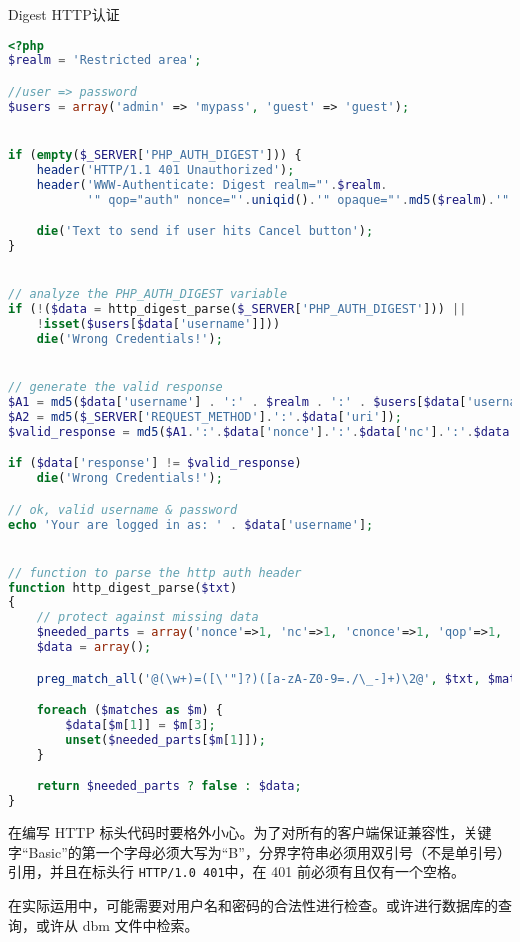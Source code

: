 \begin{example}
Digest HTTP认证
\begin{lstlisting}[language=PHP]
<?php
$realm = 'Restricted area';

//user => password
$users = array('admin' => 'mypass', 'guest' => 'guest');


if (empty($_SERVER['PHP_AUTH_DIGEST'])) {
    header('HTTP/1.1 401 Unauthorized');
    header('WWW-Authenticate: Digest realm="'.$realm.
           '" qop="auth" nonce="'.uniqid().'" opaque="'.md5($realm).'"');

    die('Text to send if user hits Cancel button');
}


// analyze the PHP_AUTH_DIGEST variable
if (!($data = http_digest_parse($_SERVER['PHP_AUTH_DIGEST'])) ||
    !isset($users[$data['username']]))
    die('Wrong Credentials!');


// generate the valid response
$A1 = md5($data['username'] . ':' . $realm . ':' . $users[$data['username']]);
$A2 = md5($_SERVER['REQUEST_METHOD'].':'.$data['uri']);
$valid_response = md5($A1.':'.$data['nonce'].':'.$data['nc'].':'.$data['cnonce'].':'.$data['qop'].':'.$A2);

if ($data['response'] != $valid_response)
    die('Wrong Credentials!');

// ok, valid username & password
echo 'Your are logged in as: ' . $data['username'];


// function to parse the http auth header
function http_digest_parse($txt)
{
    // protect against missing data
    $needed_parts = array('nonce'=>1, 'nc'=>1, 'cnonce'=>1, 'qop'=>1, 'username'=>1, 'uri'=>1, 'response'=>1);
    $data = array();

    preg_match_all('@(\w+)=([\'"]?)([a-zA-Z0-9=./\_-]+)\2@', $txt, $matches, PREG_SET_ORDER);

    foreach ($matches as $m) {
        $data[$m[1]] = $m[3];
        unset($needed_parts[$m[1]]);
    }

    return $needed_parts ? false : $data;
}
\end{lstlisting}
\end{example}

在编写 HTTP 标头代码时要格外小心。为了对所有的客户端保证兼容性，关键字“Basic”的第一个字母必须大写为“B”，分界字符串必须用双引号（不是单引号）引用，并且在标头行 \texttt{HTTP/1.0 401}中，在 401 前必须有且仅有一个空格。

在实际运用中，可能需要对用户名和密码的合法性进行检查。或许进行数据库的查询，或许从 dbm 文件中检索。

